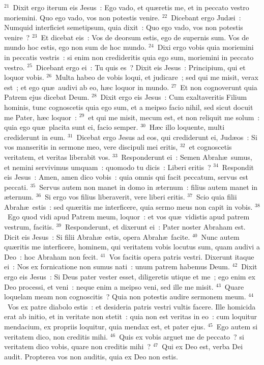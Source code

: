 ${}^{21}$~Dixit ergo iterum eis Jesus~: Ego vado, et qu\ae retis me, et in peccato vestro moriemini. Quo ego vado, vos non potestis venire.
${}^{22}$~Dicebant ergo Jud\ae i~: Numquid interficiet semetipsum, quia dixit~: Quo ego vado, vos non potestis venire~?
${}^{23}$~Et dicebat eis~: Vos de deorsum estis, ego de supernis sum. Vos de mundo hoc estis, ego non sum de hoc mundo.
${}^{24}$~Dixi ergo vobis quia moriemini in peccatis vestris~: si enim non credideritis quia ego sum, moriemini in peccato vestro.
${}^{25}$~Dicebant ergo ei~: Tu quis es~? Dixit eis Jesus~: Principium, qui et loquor vobis.
${}^{26}$~Multa habeo de vobis loqui, et judicare~; sed qui me misit, verax est~; et ego qu\ae\ audivi ab eo, h\ae c loquor in mundo.
${}^{27}$~Et non cognoverunt quia Patrem ejus dicebat Deum.
${}^{28}$~Dixit ergo eis Jesus~: Cum exaltaveritis Filium hominis, tunc cognoscetis quia ego sum, et a meipso facio nihil, sed sicut docuit me Pater, h\ae c loquor~:
${}^{29}$~et qui me misit, mecum est, et non reliquit me solum~: quia ego qu\ae\ placita sunt ei, facio semper.
${}^{30}$~H\ae c illo loquente, multi crediderunt in eum.
${}^{31}$~Dicebat ergo Jesus ad eos, qui crediderunt ei, Jud\ae os~: Si vos manseritis in sermone meo, vere discipuli mei eritis,
${}^{32}$~et cognoscetis veritatem, et veritas liberabit vos.
${}^{33}$~Responderunt ei~: Semen Abrah\ae\ sumus, et nemini servivimus umquam~: quomodo tu dicis~: Liberi eritis~?
${}^{34}$~Respondit eis Jesus~: Amen, amen dico vobis~: quia omnis qui facit peccatum, servus est peccati.
${}^{35}$~Servus autem non manet in domo in \ae ternum~: filius autem manet in \ae ternum.
${}^{36}$~Si ergo vos filius liberaverit, vere liberi eritis.
${}^{37}$~Scio quia filii Abrah\ae\ estis~: sed qu\ae ritis me interficere, quia sermo meus non capit in vobis.
${}^{38}$~Ego quod vidi apud Patrem meum, loquor~: et vos qu\ae\ vidistis apud patrem vestrum, facitis.
${}^{39}$~Responderunt, et dixerunt ei~: Pater noster Abraham est. Dicit eis Jesus~: Si filii Abrah\ae\ estis, opera Abrah\ae\ facite.
${}^{40}$~Nunc autem qu\ae ritis me interficere, hominem, qui veritatem vobis locutus sum, quam audivi a Deo~: hoc Abraham non fecit.
${}^{41}$~Vos facitis opera patris vestri. Dixerunt itaque ei~: Nos ex fornicatione non sumus nati~: unum patrem habemus Deum.
${}^{42}$~Dixit ergo eis Jesus~: Si Deus pater vester esset, diligeretis utique et me~; ego enim ex Deo processi, et veni~: neque enim a meipso veni, sed ille me misit.
${}^{43}$~Quare loquelam meam non cognoscitis~? Quia non potestis audire sermonem meum.
${}^{44}$~Vos ex patre diabolo estis~: et desideria patris vestri vultis facere. Ille homicida erat ab initio, et in veritate non stetit~: quia non est veritas in eo~: cum loquitur mendacium, ex propriis loquitur, quia mendax est, et pater ejus.
${}^{45}$~Ego autem si veritatem dico, non creditis mihi.
${}^{46}$~Quis ex vobis arguet me de peccato~? si veritatem dico vobis, quare non creditis mihi~?
${}^{47}$~Qui ex Deo est, verba Dei audit. Propterea vos non auditis, quia ex Deo non estis.


